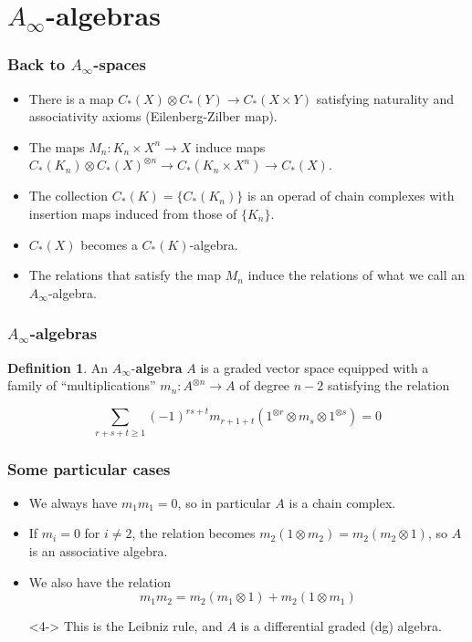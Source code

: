 \documentclass{beamer}
\theoremstyle{definition}
\newtheorem{defi}{Definition}
\begin{document}
\section{$A_\infty$-algebras}
\begin{frame}
\frametitle{Back to $A_\infty$-spaces}
\begin{itemize}
\item<1-> There is a map $C_*(X)\otimes C_*(Y)\to C_*(X\times Y)$ satisfying naturality and associativity axioms (Eilenberg-Zilber map).
\item<2-> The maps $M_n:K_n\times X^n\to X$ induce maps $C_*(K_n)\otimes C_*(X)^{\otimes n}\to C_*(K_n\times  X^n)\to C_*(X)$. %


\item<3-> The collection $C_*(K)=\{C_*(K_n)\}$ is an operad of chain complexes with insertion maps induced from those of $\{K_n\}$.
\end{itemize}
\end{frame}

\begin{frame}
\begin{itemize}
\item<1->$C_*(X)$ becomes a $C_*(K)$-algebra.


\item<2-> The relations that satisfy the map $M_n$ induce the relations of what we call an $A_\infty$-algebra.
\end{itemize}
\end{frame}
\begin{frame}
\frametitle{$A_\infty$-algebras}
\begin{defi}
An $A_\infty$-\textbf{algebra} $A$ is a graded vector space equipped with a family of ``multiplications'' $m_n:A^{\otimes n}\to A$ of degree $n-2$ satisfying the relation %

\[\sum_{r+s+t\geq 1}(-1)^{rs+t}m_{r+1+t}(1^{\otimes r}\otimes m_s\otimes 1^{\otimes s})=0\] %
\end{defi}
\end{frame}





\begin{frame}
\frametitle{Some particular cases}
\begin{itemize}
\item<1-> We always have $m_1m_1=0$, so in particular $A$ is a chain complex.%
\item<2-> If $m_i=0$ for $i\neq 2$, the relation becomes $m_2(1\otimes m_2)=m_2(m_2\otimes 1)$, so $A$ is an associative algebra.
\item<3->  We also have the relation \[m_1m_2=m_2(m_1\otimes 1)+m_2(1\otimes m_1)\]%
\item[]<4-> This is the Leibniz rule, and $A$ is a differential graded (dg) algebra.
\end{itemize}
\end{frame}
\end{document}

